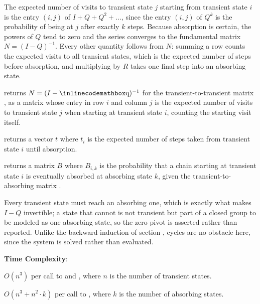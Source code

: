The expected number of visits to transient state $j$ starting from transient state $i$ is the entry $(i, j)$ of $I + Q + Q^2 + \dots$, since the entry $(i, j)$ of $Q^k$ is the probability of being at $j$ after exactly $k$ steps. Because absorption is certain, the powers of $Q$ tend to zero and the series converges to the fundamental matrix $N = (I - Q)^{-1}$. Every other quantity follows from $N$: summing a row counts the expected visits to all transient states, which is the expected number of steps before absorption, and multiplying by $R$ takes one final step into an absorbing state.

\begin{compactitem}
  \item {} returns $N = (I - {\inlinecodemath{q}})^{-1}$ for the transient-to-transient matrix , as a matrix whose entry in row $i$ and column $j$ is the expected number of visits to transient state $j$ when starting at transient state $i$, counting the starting visit itself.
  \item {} returns a vector $t$ where $t_i$ is the expected number of steps taken from transient state $i$ until absorption.
  \item {} returns a matrix $B$ where $B_{i,k}$ is the probability that a chain starting at transient state $i$ is eventually absorbed at absorbing state $k$, given the transient-to-absorbing matrix .
\end{compactitem}

Every transient state must reach an absorbing one, which is exactly what makes $I - Q$ invertible; a state that cannot is not transient but part of a closed group to be modeled as one absorbing state, so the zero pivot is asserted rather than reported. Unlike the backward induction of section , cycles are no obstacle here, since the system is solved rather than evaluated.

\textbf{Time Complexity}:
\begin{compactitem}
  \item $O(n^{3})$ per call to  and , where $n$ is the number of transient states.
  \item $O(n^{3} + n^{2} \cdot k)$ per call to , where $k$ is the number of absorbing states.
\end{compactitem}

